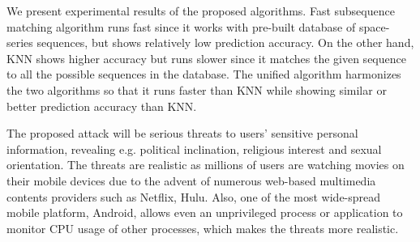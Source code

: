 We present experimental results of the proposed algorithms. Fast subsequence matching algorithm runs fast since it works with pre-built database of space-series sequences, but shows relatively low prediction accuracy.  On the other hand, KNN shows higher accuracy but runs slower since it matches the given sequence to all the possible sequences in the database.  The unified algorithm harmonizes the two algorithms so that it runs faster than KNN while showing similar or better prediction accuracy than KNN. 

The proposed attack will be serious threats to users' sensitive personal information, revealing e.g. political inclination, religious interest and sexual orientation. The threats are realistic as millions of users are watching movies on their mobile devices due to the advent of numerous web-based multimedia contents providers such as Netflix, Hulu. Also, one of the most wide-spread mobile platform, Android, allows even an unprivileged process or application to monitor CPU usage of other processes, which makes the threats more realistic. 